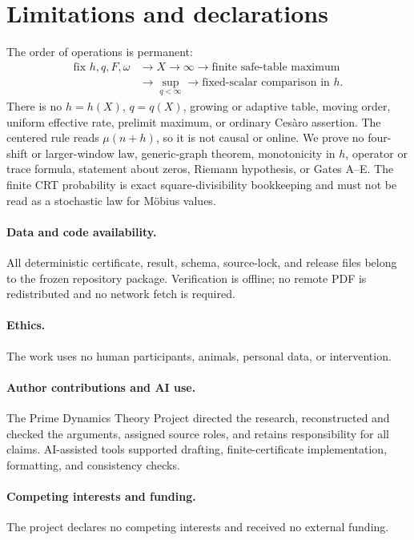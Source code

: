 \documentclass[12pt,a4paper]{article}
\theoremstyle{definition}
\newcommand{\mob}{\mu}
\begin{document}
\section{Limitations and declarations}

The order of operations is permanent:
\begin{align*}
 \text{fix }h,q,F,\omega
 &\longrightarrow X\to\infty
 \longrightarrow \text{finite safe-table maximum}\\
 &\longrightarrow \sup_{q<\infty}
 \longrightarrow \text{fixed-scalar comparison in }h.
\end{align*}
There is no \(h=h(X)\), \(q=q(X)\), growing or adaptive table, moving order,
uniform effective rate, prelimit maximum, or ordinary Ces\`aro assertion.  The
centered rule reads \(\mob(n+h)\), so it is not causal or online.  We prove no
four-shift or larger-window law, generic-graph theorem, monotonicity in \(h\),
operator or trace formula, statement about zeros, Riemann hypothesis, or Gates
A--E.  The finite CRT probability is exact square-divisibility bookkeeping and
must not be read as a stochastic law for M\"obius values.

\paragraph{Data and code availability.}
All deterministic certificate, result, schema, source-lock, and release files
belong to the frozen repository package.  Verification is offline; no remote
PDF is redistributed and no network fetch is required.

\paragraph{Ethics.}
The work uses no human participants, animals, personal data, or intervention.

\paragraph{Author contributions and AI use.}
The Prime Dynamics Theory Project directed the research, reconstructed and
checked the arguments, assigned source roles, and retains responsibility for
all claims.  AI-assisted tools supported drafting, finite-certificate
implementation, formatting, and consistency checks.

\paragraph{Competing interests and funding.}
The project declares no competing interests and received no external funding.



\end{document}
